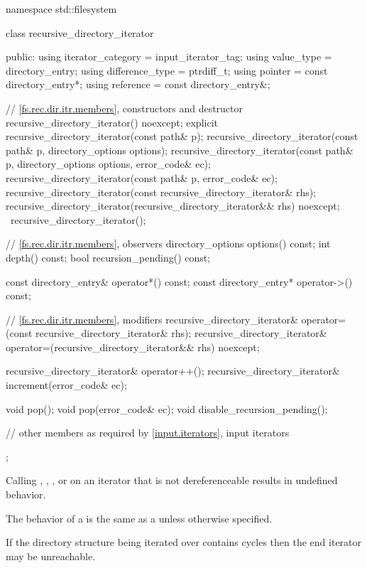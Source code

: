 \begin{codeblock}
namespace std::filesystem {
  class recursive_directory_iterator {
  public:
    using iterator_category = input_iterator_tag;
    using value_type        = directory_entry;
    using difference_type   = ptrdiff_t;
    using pointer           = const directory_entry*;
    using reference         = const directory_entry&;

    // \ref{fs.rec.dir.itr.members}, constructors and destructor
    recursive_directory_iterator() noexcept;
    explicit recursive_directory_iterator(const path& p);
    recursive_directory_iterator(const path& p, directory_options options);
    recursive_directory_iterator(const path& p, directory_options options,
                                 error_code& ec);
    recursive_directory_iterator(const path& p, error_code& ec);
    recursive_directory_iterator(const recursive_directory_iterator& rhs);
    recursive_directory_iterator(recursive_directory_iterator&& rhs) noexcept;
    ~recursive_directory_iterator();

    // \ref{fs.rec.dir.itr.members}, observers
    directory_options  options() const;
    int                depth() const;
    bool               recursion_pending() const;

    const directory_entry& operator*() const;
    const directory_entry* operator->() const;

    // \ref{fs.rec.dir.itr.members}, modifiers
    recursive_directory_iterator&
      operator=(const recursive_directory_iterator& rhs);
    recursive_directory_iterator&
      operator=(recursive_directory_iterator&& rhs) noexcept;

    recursive_directory_iterator& operator++();
    recursive_directory_iterator& increment(error_code& ec);

    void pop();
    void pop(error_code& ec);
    void disable_recursion_pending();

    // other members as required by \ref{input.iterators}, input iterators
  };
}
\end{codeblock}

\pnum
Calling , , ,
 or 
on an iterator that is not dereferenceable results in undefined behavior.

\pnum
The behavior of a  is the same
as a  unless otherwise specified.

\pnum
\begin{note} If the directory structure being iterated over contains cycles
then the end iterator may be unreachable. \end{note}

